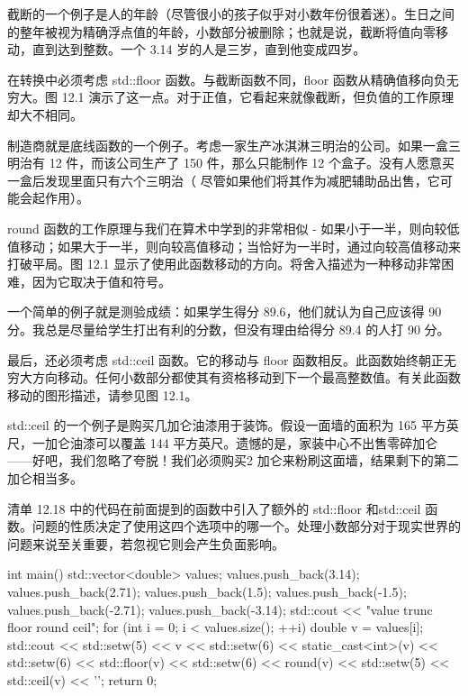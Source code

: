 
截断的一个例子是人的年龄（尽管很小的孩子似乎对小数年份很着迷）。生日之间的整年被视为精确浮点值的年龄，小数部分被删除；也就是说，截断将值向零移动，直到达到整数。一个 3.14 岁的人是三岁，直到他变成四岁。

在转换中必须考虑 std::floor 函数。与截断函数不同，floor 函数从精确值移向负无穷大。图 12.1 演示了这一点。对于正值，它看起来就像截断，但负值的工作原理却大不相同。

制造商就是底线函数的一个例子。考虑一家生产冰淇淋三明治的公司。如果一盒三明治有 12 件，而该公司生产了 150 件，那么只能制作 12 个盒子。没有人愿意买一盒后发现里面只有六个三明治（ 尽管如果他们将其作为减肥辅助品出售，它可能会起作用）。

round 函数的工作原理与我们在算术中学到的非常相似 - 如果小于一半，则向较低值移动；如果大于一半，则向较高值移动；当恰好为一半时，通过向较高值移动来打破平局。图 12.1 显示了使用此函数移动的方向。将舍入描述为一种移动非常困难，因为它取决于值和符号。

一个简单的例子就是测验成绩：如果学生得分 89.6，他们就认为自己应该得 90 分。我总是尽量给学生打出有利的分数，但没有理由给得分 89.4 的人打 90 分。

最后，还必须考虑 std::ceil 函数。它的移动与 floor 函数相反。此函数始终朝正无穷大方向移动。任何小数部分都使其有资格移动到下一个最高整数值。有关此函数移动的图形描述，请参见图 12.1。

std::ceil 的一个例子是购买几加仑油漆用于装饰。假设一面墙的面积为 165 平方英尺，一加仑油漆可以覆盖 144 平方英尺。遗憾的是，家装中心不出售零碎加仑——好吧，我们忽略了夸脱！我们必须购买2 加仑来粉刷这面墙，结果剩下的第二加仑相当多。

清单 12.18 中的代码在前面提到的函数中引入了额外的 std::floor 和std::ceil 函数。问题的性质决定了使用这四个选项中的哪一个。处理小数部分对于现实世界的问题来说至关重要，若忽视它则会产生负面影响。


\begin{cpp}
int main() {
  std::vector<double> values;
  values.push_back(3.14); values.push_back(2.71); values.push_back(1.5);
  values.push_back(-1.5); values.push_back(-2.71);
  values.push_back(-3.14);
  std::cout << "value trunc floor round ceil\n";
  for (int i = 0; i < values.size(); ++i) {
    double v = values[i];
    std::cout << std::setw(5) << v
      << std::setw(6) << static_cast<int>(v)
      << std::setw(6) << std::floor(v)
      << std::setw(6) << round(v)
      << std::setw(5) << std::ceil(v)
      << '\n';
  }
  return 0;
}
\end{cpp}

